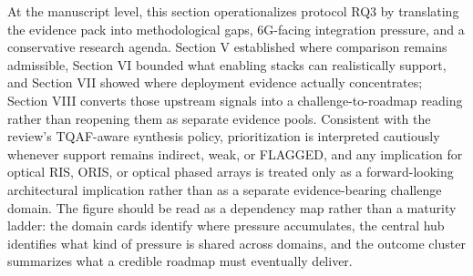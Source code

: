 {}At the manuscript level, this section operationalizes protocol RQ3 by translating the evidence pack into methodological gaps, 6G-facing integration pressure, and a conservative research agenda. Section V established where comparison remains admissible, Section VI bounded what enabling stacks can realistically support, and Section VII showed where deployment evidence actually concentrates; Section VIII converts those upstream signals into a challenge-to-roadmap reading rather than reopening them as separate evidence pools. Consistent with the review's TQAF-aware synthesis policy, prioritization is interpreted cautiously whenever support remains indirect, weak, or FLAGGED, and any implication for optical RIS, ORIS, or optical phased arrays is treated only as a forward-looking architectural implication rather than as a separate evidence-bearing challenge domain.\markdownRendererParagraphSeparator
{}\markdownRendererParagraphSeparator
{}The figure should be read as a dependency map rather than a maturity ladder: the domain cards identify where pressure accumulates, the central hub identifies what kind of pressure is shared across domains, and the outcome cluster summarizes what a credible roadmap must eventually deliver.\markdownRendererInterblockSeparator
{}\markdownRendererSectionBegin
{}\markdownRendererInterblockSeparator
{}\markdownRendererSectionBegin
{}\markdownRendererInterblockSeparator
